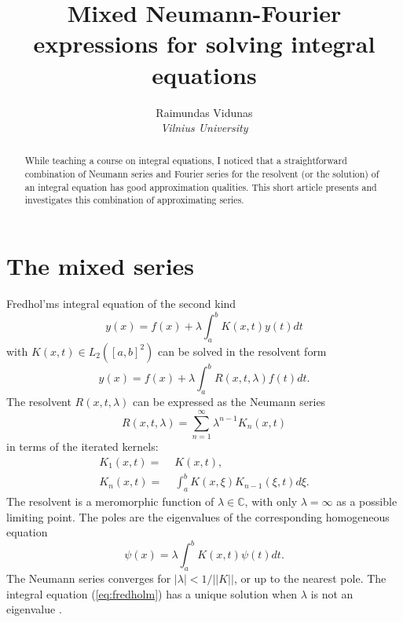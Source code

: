 \documentclass{article}
\title{\bf Mixed Neumann-Fourier expressions for solving integral equations}
\author{Raimundas Vidunas\\
\em Vilnius University}
\newcommand{\CC}{\mathbb{C}}
\begin{document}
\date{}
\maketitle

\begin{abstract}
While teaching a course on integral equations, I noticed that a straightforward combination of Neumann series 
and Fourier series for the resolvent (or the solution) of an integral equation has good approximation qualities. 
This short article presents and investigates this combination of approximating series.
\end{abstract}

\section{The mixed series}

Fredhol'ms integral equation of the second kind
\begin{equation} \label{eq:fredholm}
y(x)=f(x)+\lambda\int_a^b K(x,t) y(t)dt
\end{equation}
with $K(x,t)\in L_2([a,b]^2)$ can be solved \cite[Ch.~3]{Kanwal} in the resolvent form
\begin{equation} \label{fr:sol}
y(x)=f(x)+\lambda\int_a^b R(x,t,\lambda) f(t)dt.
\end{equation}
The resolvent $R(x,t,\lambda)$ can be expressed as the Neumann series
\begin{equation}
R(x,t,\lambda)=\sum_{n=1}^{\infty} \lambda^{n-1} K_n(x,t) 
\end{equation}
in terms of the iterated kernels:
\begin{align}
K_1(x,t)= &\; K(x,t), \\  \label{eq:iterk}
K_n(x,t)= &\; \int_a^b K(x,\xi)K_{n-1}(\xi,t)d\xi.
\end{align}
The resolvent is a meromorphic function of $\lambda\in\CC$,
with only $\lambda=\infty$ as a possible limiting point. 
The poles are the eigenvalues of the corresponding homogeneous equation
\begin{equation} \label{eq:homog}
\psi(x)=\lambda\int_a^b K(x,t) \psi(t)dt.
\end{equation}
The Neumann series converges for $|\lambda|<1/||K||$,  or up to the nearest pole. 
The integral equation (\ref{eq:fredholm}) has a unique solution when $\lambda$ is not an eigenvalue \cite[Ch.~4.2]{Kanwal}. 
\end{document}
